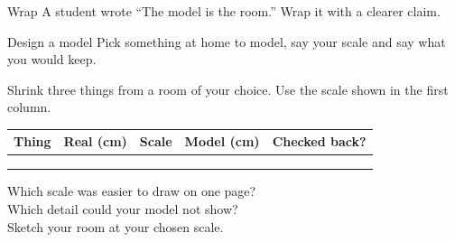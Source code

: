 \begin{puzzle}{Wrap}
A student wrote ``The model is the room.'' Wrap it with a clearer claim. \wline[6cm]
\end{puzzle}

\begin{puzzle}{Design a model}
Pick something at home to model, say your scale and say what you would keep. \wline[6cm]
\end{puzzle}
\clearpage

\thispagestyle{fancy}
Shrink three things from a room of your choice. Use the scale shown in the first column.\par\medskip
\renewcommand{\arraystretch}{3.0}
\begin{tabularx}{\linewidth}{|>{\sffamily\small\bfseries}p{2.6cm}|X|X|X|X|}
\hline
Thing & Real (cm) & Scale & Model (cm) & Checked back? \\ \hline
 & & & & \\ \hline
 & & & & \\ \hline
 & & & & \\ \hline
\end{tabularx}

\vspace{8pt}
Which scale was easier to draw on one page? \wline[7cm]\\[10pt]
Which detail could your model not show? \wline[5cm]\\[10pt]
Sketch your room at your chosen scale.\par\medskip
{}
\clearpage
